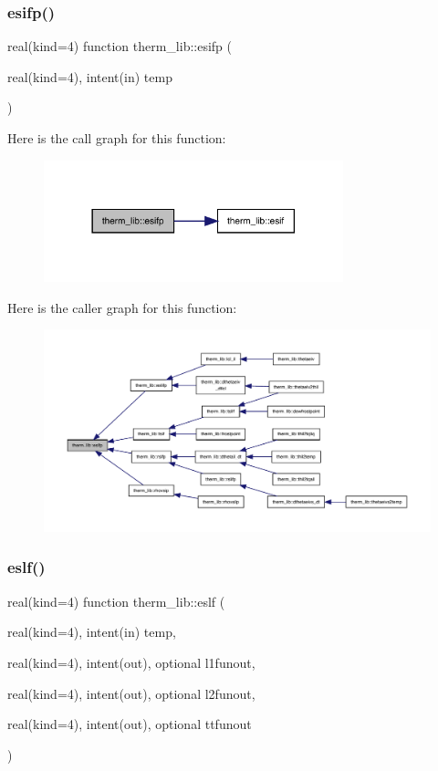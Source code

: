\subsubsection{\texorpdfstring{esifp()}{esifp()}}
{\footnotesize\ttfamily real(kind=4) function therm\+\_\+lib\+::esifp (\begin{DoxyParamCaption}\item[{real(kind=4), intent(in)}]{temp }\end{DoxyParamCaption})}

Here is the call graph for this function\+:
\nopagebreak
\begin{figure}[H]
\begin{center}
\leavevmode
\includegraphics[width=246pt]{namespacetherm__lib_a4c1f51941fe39db465e2fba15c887667_cgraph}
\end{center}
\end{figure}
Here is the caller graph for this function\+:
\nopagebreak
\begin{figure}[H]
\begin{center}
\leavevmode
\includegraphics[width=350pt]{namespacetherm__lib_a4c1f51941fe39db465e2fba15c887667_icgraph}
\end{center}
\end{figure}
\mbox{\label{namespacetherm__lib_a82ae02323247d6435153002a309552fb}} 
\subsubsection{\texorpdfstring{eslf()}{eslf()}}
{\footnotesize\ttfamily real(kind=4) function therm\+\_\+lib\+::eslf (\begin{DoxyParamCaption}\item[{real(kind=4), intent(in)}]{temp,  }\item[{real(kind=4), intent(out), optional}]{l1funout,  }\item[{real(kind=4), intent(out), optional}]{l2funout,  }\item[{real(kind=4), intent(out), optional}]{ttfunout }\end{DoxyParamCaption})}

